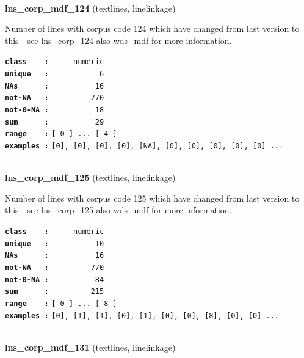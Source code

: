 \documentclass[]{article}
\begin{document}
~

\textbf{lns\_corp\_mdf\_124} (textlines, linelinkage)

Number of lines with corpus code 124 which have changed from last
version to this - see lns\_corp\_124 also wds\_mdf for more information.

\textbf{\texttt{class\ \ \ \ :}} \texttt{~~~~~numeric}\\
\textbf{\texttt{unique\ \ \ :}} \texttt{~~~~~~~~~~~6}\\
\textbf{\texttt{NAs\ \ \ \ \ \ :}} \texttt{~~~~~~~~~~16}\\
\textbf{\texttt{not-NA\ \ \ :}} \texttt{~~~~~~~~~770}\\
\textbf{\texttt{not-0-NA\ :}} \texttt{~~~~~~~~~~18}\\
\textbf{\texttt{sum\ \ \ \ \ \ :}} \texttt{~~~~~~~~~~29}\\
\textbf{\texttt{range\ \ \ \ :}}
\texttt{{[}\ 0\ {]}\ ...\ {[}\ 4\ {]}}\\
\textbf{\texttt{examples\ :}}
\texttt{{[}0{]},\ {[}0{]},\ {[}0{]},\ {[}0{]},\ {[}NA{]},\ {[}0{]},\ {[}0{]},\ {[}0{]},\ {[}0{]},\ {[}0{]}\ ...}\\

~

\textbf{lns\_corp\_mdf\_125} (textlines, linelinkage)

Number of lines with corpus code 125 which have changed from last
version to this - see lns\_corp\_125 also wds\_mdf for more information.

\textbf{\texttt{class\ \ \ \ :}} \texttt{~~~~~numeric}\\
\textbf{\texttt{unique\ \ \ :}} \texttt{~~~~~~~~~~10}\\
\textbf{\texttt{NAs\ \ \ \ \ \ :}} \texttt{~~~~~~~~~~16}\\
\textbf{\texttt{not-NA\ \ \ :}} \texttt{~~~~~~~~~770}\\
\textbf{\texttt{not-0-NA\ :}} \texttt{~~~~~~~~~~84}\\
\textbf{\texttt{sum\ \ \ \ \ \ :}} \texttt{~~~~~~~~~215}\\
\textbf{\texttt{range\ \ \ \ :}}
\texttt{{[}\ 0\ {]}\ ...\ {[}\ 8\ {]}}\\
\textbf{\texttt{examples\ :}}
\texttt{{[}0{]},\ {[}1{]},\ {[}1{]},\ {[}0{]},\ {[}1{]},\ {[}0{]},\ {[}0{]},\ {[}8{]},\ {[}0{]},\ {[}0{]}\ ...}\\

~

\textbf{lns\_corp\_mdf\_131} (textlines, linelinkage)
\end{document}
